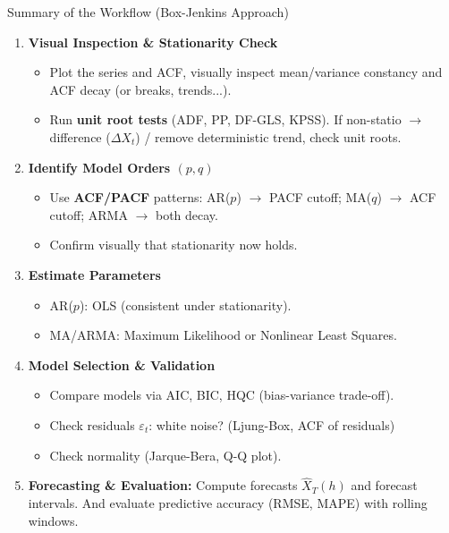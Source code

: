 \documentclass{beamer}
\begin{document}
\begin{frame}{Summary of the Workflow (Box-Jenkins Approach)}
\footnotesize
\begin{enumerate}
  \item \textbf{Visual Inspection \& Stationarity Check}
    \begin{itemize}
      \item Plot the series and ACF, visually inspect mean/variance constancy and ACF decay (or breaks, trends...).
      \item Run \textbf{unit root tests} (ADF, PP, DF-GLS, KPSS). If non-statio $\to$ difference ($\Delta X_t$) / remove deterministic trend, check unit roots.
    \end{itemize}

  \item \textbf{Identify Model Orders $(p,q)$}
    \begin{itemize}
      \item Use \textbf{ACF/PACF} patterns:
        AR($p$) $\to$ PACF cutoff; MA($q$) $\to$ ACF cutoff; ARMA $\to$ both decay.
      \item Confirm visually that stationarity now holds.
    \end{itemize}

  \item \textbf{Estimate Parameters}
    \begin{itemize}
      \item AR($p$): OLS (consistent under stationarity).
      \item MA/ARMA: Maximum Likelihood or Nonlinear Least Squares.
    \end{itemize}

  \item \textbf{Model Selection \& Validation}
    \begin{itemize}
      \item Compare models via AIC, BIC, HQC (bias-variance trade-off).
      \item Check residuals $\varepsilon_t$: white noise? (Ljung-Box, ACF of residuals)
      \item Check normality (Jarque-Bera, Q-Q plot).
    \end{itemize}

  \item \textbf{Forecasting \& Evaluation:} Compute forecasts $\hat X_{T}(h)$ and forecast intervals. And evaluate predictive accuracy (RMSE, MAPE) with rolling windows.
\end{enumerate}
\end{frame}
\end{document}
